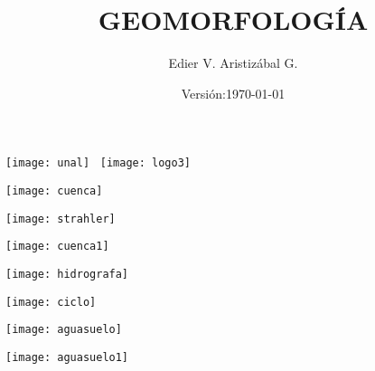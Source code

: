 \documentclass{beamer}
\title[Ambiente Torrencial]{GEOMORFOLOGÍA}
\author[Edier Aristizabal]{Edier V. Aristizábal G.}
\institute{evaristizabalg@unal.edu.co}
\date{\tiny{Versión:\today}}
\begin{document}
\begin{frame}
\titlepage
\centering
	\texttt{[image: unal]}\hspace*{4.75cm}~%
   	\texttt{[image: logo3]} 
\end{frame}
\begin{frame}
\begin{center}
   	\texttt{[image: cuenca]}
\end{center}
\end{frame}
\begin{frame}
\begin{center}
   	\texttt{[image: strahler]}
\end{center}
\end{frame}
\begin{frame}
\begin{center}
   	\texttt{[image: cuenca1]}
\end{center}
\end{frame}
\begin{frame}
\begin{center}
   	\texttt{[image: hidrografa]}
\end{center}
\end{frame}
\begin{frame}
\begin{center}
   	\texttt{[image: ciclo]}
\end{center}
\end{frame}
\begin{frame}
\begin{center}
   	\texttt{[image: aguasuelo]}
\end{center}
\end{frame}
\begin{frame}
\begin{center}
   	\texttt{[image: aguasuelo1]}
\end{center}
\end{frame}
\end{document}
